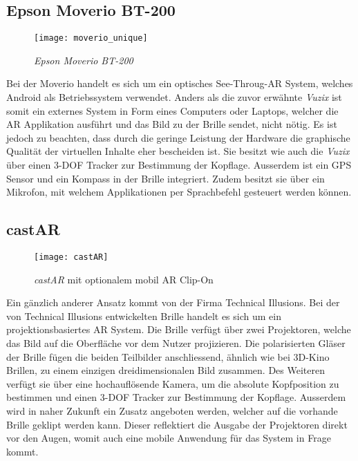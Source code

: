 \subsection*{Epson Moverio BT-200}
\begin{wrapfigure}{l}{0.5\textwidth}
	\vspace{-20pt}
	\begin{center}
		\texttt{[image: moverio\_unique]}
	\end{center}
	\vspace{-15pt}
	\caption{\textit{Epson Moverio BT-200}}\label{moveriogrpahic}
	\vspace{-12pt}
\end{wrapfigure}
Bei der Moverio handelt es sich um ein optisches See-Throug-AR System, welches Android als Betriebssystem verwendet. Anders als die zuvor erwähnte \textit{Vuzix} ist somit ein externes System in Form eines Computers oder Laptops, welcher die AR Applikation ausführt und das Bild zu der Brille sendet, nicht nötig. Es ist jedoch zu beachten, dass durch die geringe Leistung der Hardware die graphische Qualität der virtuellen Inhalte eher bescheiden ist.  Sie besitzt wie auch die \textit{Vuzix} über einen 3-DOF Tracker zur Bestimmung der Kopflage. Ausserdem ist ein GPS Sensor und ein Kompass in der Brille integriert. Zudem besitzt sie über ein Mikrofon, mit welchem Applikationen per Sprachbefehl gesteuert werden können.\cite{website:epson}

\subsection*{castAR}
\begin{wrapfigure}{r}{0.45\textwidth}
	\vspace{-30pt}
	\begin{center}
		\texttt{[image: castAR]}
	\end{center}
	\vspace{-15pt}
	\captionsetup{width=0.38\textwidth}
	\caption{\textit{castAR} mit optionalem mobil AR Clip-On}\label{castAR}
	\vspace{-30pt}
\end{wrapfigure}
Ein gänzlich anderer Ansatz kommt von der Firma Technical Illusions. Bei der von Technical Illusions entwickelten Brille handelt es sich um ein projektionsbasiertes AR System. Die Brille verfügt über zwei Projektoren, welche das Bild auf die Oberfläche vor dem Nutzer projizieren. Die polarisierten Gläser der Brille fügen die beiden Teilbilder anschliessend, ähnlich wie bei 3D-Kino Brillen, zu einem einzigen dreidimensionalen Bild zusammen. Des Weiteren verfügt sie über eine hochauflösende Kamera, um die absolute Kopfposition zu bestimmen und einen 3-DOF Tracker zur Bestimmung der Kopflage. Ausserdem wird in naher Zukunft ein Zusatz angeboten werden, welcher auf die vorhande Brille geklipt werden kann. Dieser reflektiert die Ausgabe der Projektoren direkt vor den Augen, womit auch eine mobile Anwendung für das System in Frage kommt.\cite{website:castAR}

